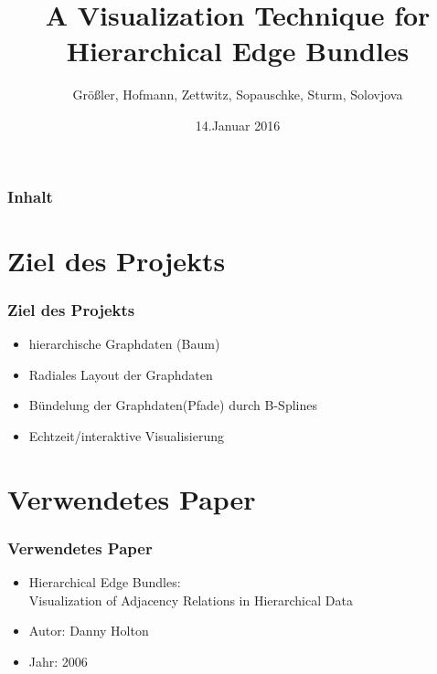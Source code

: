 \documentclass[11pt]{beamer}
\author{Größler, Hofmann, Zettwitz, Sopauschke, Sturm, Solovjova}
\title{A Visualization Technique for \\  Hierarchical Edge Bundles}
\date{14.Januar 2016}
\begin{document}
\begin{frame}
\titlepage
\end{frame}

\begin{frame}
\frametitle{Inhalt} 
\tableofcontents
\end{frame}


\section{Ziel des Projekts}
\begin{frame}
\frametitle{Ziel des Projekts}
\begin{itemize} 
\item hierarchische Graphdaten (Baum)
\item Radiales Layout der Graphdaten
\item Bündelung der Graphdaten(Pfade) durch B-Splines
\item Echtzeit/interaktive Visualisierung
\end{itemize}
\end{frame}

\section{Verwendetes Paper}
\begin{frame}[allowframebreaks]
\frametitle{Verwendetes Paper}
\begin{itemize} 
\item Hierarchical Edge Bundles: \\
Visualization of Adjacency Relations in Hierarchical Data
\item Autor: Danny Holton
\item Jahr: 2006
\end{itemize}
\end{frame}
\end{document}
